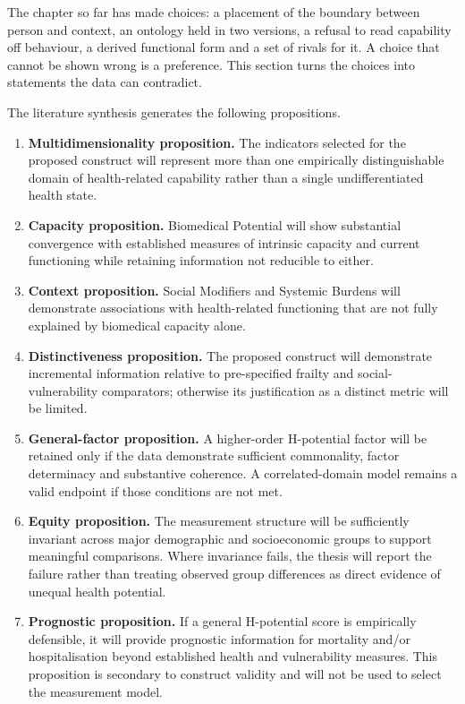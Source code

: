 The chapter so far has made choices: a placement of the boundary between person and context, an ontology held in two versions, a refusal to read capability off behaviour, a derived functional form and a set of rivals for it. A choice that cannot be shown wrong is a preference. This section turns the choices into statements the data can contradict.

The literature synthesis generates the following propositions.

\begin{enumerate}
    \item \textbf{Multidimensionality proposition.} The indicators selected for the proposed construct will represent more than one empirically distinguishable domain of health-related capability rather than a single undifferentiated health state.
    \item \textbf{Capacity proposition.} Biomedical Potential will show substantial convergence with established measures of intrinsic capacity and current functioning while retaining information not reducible to either.
    \item \textbf{Context proposition.} Social Modifiers and Systemic Burdens will demonstrate associations with health-related functioning that are not fully explained by biomedical capacity alone.
    \item \textbf{Distinctiveness proposition.} The proposed construct will demonstrate incremental information relative to pre-specified frailty and social-vulnerability comparators; otherwise its justification as a distinct metric will be limited.
    \item \textbf{General-factor proposition.} A higher-order H-potential factor will be retained only if the data demonstrate sufficient commonality, factor determinacy and substantive coherence. A correlated-domain model remains a valid endpoint if those conditions are not met.
    \item \textbf{Equity proposition.} The measurement structure will be sufficiently invariant across major demographic and socioeconomic groups to support meaningful comparisons. Where invariance fails, the thesis will report the failure rather than treating observed group differences as direct evidence of unequal health potential.
    \item \textbf{Prognostic proposition.} If a general H-potential score is empirically defensible, it will provide prognostic information for mortality and/or hospitalisation beyond established health and vulnerability measures. This proposition is secondary to construct validity and will not be used to select the measurement model.
\end{enumerate}

